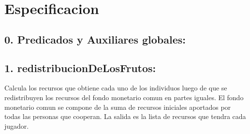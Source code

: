 \documentclass[10pt,a4paper]{article}
\begin{document}
\maketitle

\section{Especificacion}



\subsection*{0. Predicados y Auxiliares globales:}
	\hfill

		{
		}
	
	{}





\subsection*{1. redistribucionDeLosFrutos:}
	Calcula los recursos que obtiene cada uno de los individuos luego de que se redistribuyen
	los recursos del fondo monetario comun en partes iguales. El fondo monetario comun se compone de la suma de recursos
	iniciales aportados por todas las personas que cooperan. La salida es la lista de recursos que tendra cada jugador.
\end{document}

